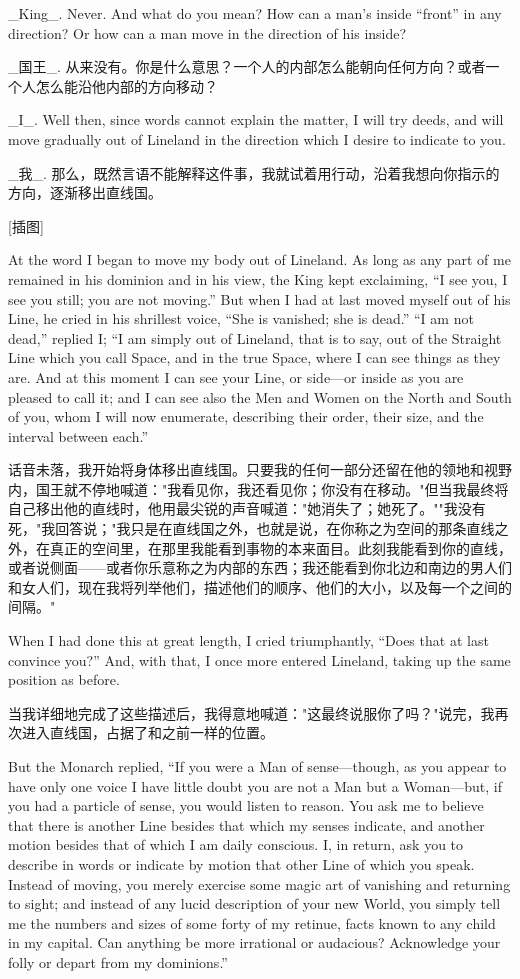 \documentclass[12pt,UTF8]{ctexbook}
\begin{document}
\_King\_. Never. And what do you mean? How can a man's inside ``front'' in any direction? Or how can a man move in the direction of his inside?

\_国王\_. 从来没有。你是什么意思？一个人的内部怎么能朝向任何方向？或者一个人怎么能沿他内部的方向移动？

\_I\_. Well then, since words cannot explain the matter, I will try deeds, and will move gradually out of Lineland in the direction which I desire to indicate to you.

\_我\_. 那么，既然言语不能解释这件事，我就试着用行动，沿着我想向你指示的方向，逐渐移出直线国。

[插图]

At the word I began to move my body out of Lineland. As long as any part of me remained in his dominion and in his view, the King kept exclaiming, ``I see you, I see you still; you are not moving.'' But when I had at last moved myself out of his Line, he cried in his shrillest voice, ``She is vanished; she is dead.'' ``I am not dead,'' replied I; ``I am simply out of Lineland, that is to say, out of the Straight Line which you call Space, and in the true Space, where I can see things as they are. And at this moment I can see your Line, or side---or inside as you are pleased to call it; and I can see also the Men and Women on the North and South of you, whom I will now enumerate, describing their order, their size, and the interval between each.''

话音未落，我开始将身体移出直线国。只要我的任何一部分还留在他的领地和视野内，国王就不停地喊道："我看见你，我还看见你；你没有在移动。"但当我最终将自己移出他的直线时，他用最尖锐的声音喊道："她消失了；她死了。""我没有死，"我回答说；"我只是在直线国之外，也就是说，在你称之为空间的那条直线之外，在真正的空间里，在那里我能看到事物的本来面目。此刻我能看到你的直线，或者说侧面——或者你乐意称之为内部的东西；我还能看到你北边和南边的男人们和女人们，现在我将列举他们，描述他们的顺序、他们的大小，以及每一个之间的间隔。"

When I had done this at great length, I cried triumphantly, ``Does that at last convince you?'' And, with that, I once more entered Lineland, taking up the same position as before.

当我详细地完成了这些描述后，我得意地喊道："这最终说服你了吗？"说完，我再次进入直线国，占据了和之前一样的位置。

But the Monarch replied, ``If you were a Man of sense---though, as you appear to have only one voice I have little doubt you are not a Man but a Woman---but, if you had a particle of sense, you would listen to reason. You ask me to believe that there is another Line besides that which my senses indicate, and another motion besides that of which I am daily conscious. I, in return, ask you to describe in words or indicate by motion that other Line of which you speak. Instead of moving, you merely exercise some magic art of vanishing and returning to sight; and instead of any lucid description of your new World, you simply tell me the numbers and sizes of some forty of my retinue, facts known to any child in my capital. Can anything be more irrational or audacious? Acknowledge your folly or depart from my dominions.''
\end{document}
